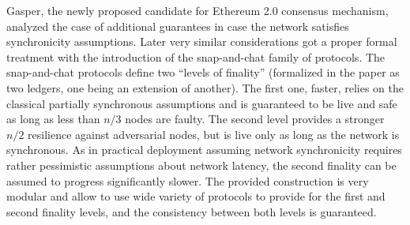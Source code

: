 \documentclass[12pt, fleqn]{article}
\begin{document}
Gasper\cite{BHKPQRSWZ18}, the newly proposed candidate for Ethereum 2.0 consensus mechanism, analyzed the case of additional guarantees in case the network satisfies synchronicity assumptions. Later very similar considerations got a proper formal treatment with the introduction of the snap-and-chat family of protocols\cite{NNT20}.
The snap-and-chat protocols define two ``levels of finality'' (formalized in the paper as two ledgers, one being an extension of another). The first one, faster, relies on the classical partially synchronous assumptions and is guaranteed to be live and safe as long as less than $n/3$ nodes are faulty. 
The second level provides a stronger $n/2$ resilience against adversarial nodes, but is live only as long as the network is synchronous.
As in practical deployment assuming network synchronicity requires rather pessimistic assumptions about network latency, the second finality can be assumed to progress significantly slower. 
The provided construction is very modular and allow to use wide variety of protocols to provide for the first and second finality levels, and the consistency between both levels is guaranteed.
\end{document}
